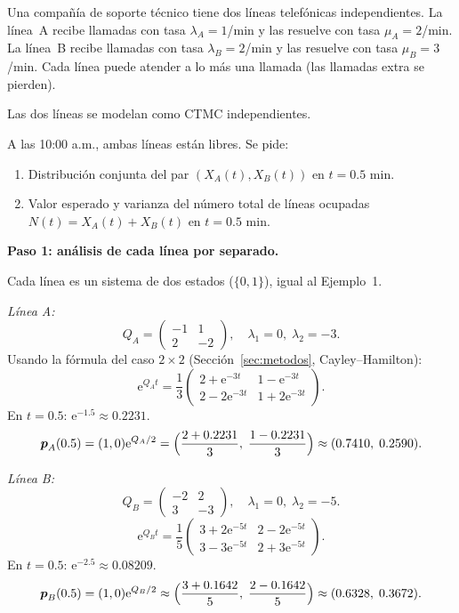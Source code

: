 \documentclass[11pt,a4paper]{article}
\theoremstyle{definition}
\theoremstyle{remark}
\newcommand{\e}{\mathrm{e}}
\begin{document}
\begin{ejemplo}
Una compañía de soporte técnico tiene dos líneas telefónicas
independientes.  La línea~A recibe llamadas con tasa $\lambda_A=1$/min y
las resuelve con tasa $\mu_A=2$/min.  La línea~B recibe llamadas con tasa
$\lambda_B=2$/min y las resuelve con tasa $\mu_B=3$/min.  Cada línea
puede atender a lo más una llamada (las llamadas extra se pierden).

Las dos líneas se modelan como CTMC independientes.

A las 10:00 a.m., ambas líneas están libres.  Se pide:

\begin{enumerate}[label=(\alph*)]
  \item Distribución conjunta del par $(X_A(t),X_B(t))$ en $t=0.5$ min.
  \item Valor esperado y varianza del número total de líneas ocupadas
        $N(t) = X_A(t)+X_B(t)$ en $t=0.5$ min.
\end{enumerate}

\tcblower

\textbf{Paso 1: análisis de cada línea por separado.}

Cada línea es un sistema de dos estados ($\{0,1\}$), igual al
Ejemplo~1.

\medskip
\emph{Línea A:}
\[
  Q_A = \begin{pmatrix}-1&1\\2&-2\end{pmatrix},
  \quad
  \lambda_1=0,\;\lambda_2=-3.
\]
Usando la fórmula del caso $2\times 2$ (Sección~\ref{sec:metodos},
Cayley--Hamilton):
\[
  \e^{Q_A t} = \frac{1}{3}\begin{pmatrix}
    2+\e^{-3t} & 1-\e^{-3t} \\
    2-2\e^{-3t} & 1+2\e^{-3t}
  \end{pmatrix}.
\]
En $t=0.5$: $\e^{-1.5}\approx 0.2231$.
\[
  \boldsymbol{p}_A(0.5) = (1,0)\e^{Q_A/2}
  = \Bigl(\frac{2+0.2231}{3},\;\frac{1-0.2231}{3}\Bigr)
  \approx (0.7410,\;0.2590).
\]

\emph{Línea B:}
\[
  Q_B = \begin{pmatrix}-2&2\\3&-3\end{pmatrix},
  \quad
  \lambda_1=0,\;\lambda_2=-5.
\]
\[
  \e^{Q_B t} = \frac{1}{5}\begin{pmatrix}
    3+2\e^{-5t} & 2-2\e^{-5t} \\
    3-3\e^{-5t} & 2+3\e^{-5t}
  \end{pmatrix}.
\]
En $t=0.5$: $\e^{-2.5}\approx 0.08209$.
\[
  \boldsymbol{p}_B(0.5) = (1,0)\e^{Q_B/2}
  \approx \Bigl(\frac{3+0.1642}{5},\;\frac{2-0.1642}{5}\Bigr)
  \approx (0.6328,\;0.3672).
\]


\end{ejemplo}
\end{document}
